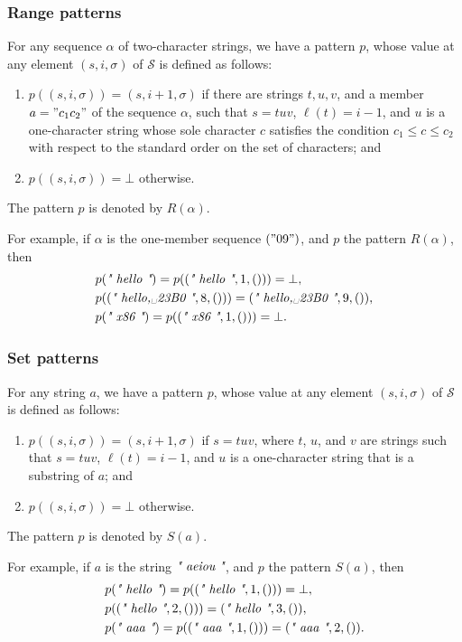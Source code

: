 \documentclass{article}
\begin{document}
\subsubsection{Range patterns}
\label{sec:9vfw1yf3}

For any sequence \(\alpha\) of two-character strings, we have a
pattern \(p\), whose value at any element \((s, i, \sigma)\) of
\(\mathscr{S}\) is defined as follows:
\begin{enumerate}
\item \(p((s, i, \sigma)) = (s, i + 1, \sigma)\) if there are strings
  \(t, u, v\), and a member \(a = "c_1c_2"\) of the sequence
  \(\alpha\), such that \(s = tuv\), \(\ell(t) = i - 1\), and \(u\) is
  a one-character string whose sole character \(c\) satisfies the
  condition \(c_1 \leq c \leq c_2\) with respect to the standard order
  on the set of characters; and
\item \(p((s, i, \sigma)) = \bot\) otherwise.
\end{enumerate}
The pattern \(p\) is denoted by \(R(\alpha)\).

For example, if \(\alpha\) is the one-member sequence \(("09")\), and
\(p\) the pattern \(R(\alpha)\), then
\begin{align*}
  &p(\text{\itshape" hello "}) = p((\text{\itshape" hello "}, 1, ())) = \bot, \\
  &p((\text{\itshape" hello,␣23B0 "}, 8, ())) = (\text{\itshape" hello,␣23B0 "}, 9, ()), \\
  &p(\text{\itshape" x86 "}) = p((\text{\itshape" x86 "}, 1, ())) = \bot.
\end{align*}

\subsubsection{Set patterns}
\label{sec:zxaanwjq}

For any string \(a\), we have a pattern \(p\), whose value at any
element \((s, i, \sigma)\) of \(\mathscr{S}\) is defined as follows:
\begin{enumerate}
\item \(p((s, i, \sigma)) = (s, i + 1, \sigma)\) if \(s = tuv\), where
  \(t\), \(u\), and \(v\) are strings such that \(s = tuv\),
  \(\ell(t) = i - 1\), and \(u\) is a one-character string that is a
  substring of \(a\); and
\item \(p((s, i, \sigma)) = \bot\) otherwise.
\end{enumerate}
The pattern \(p\) is denoted by \(S(a)\).

For example, if \(a\) is the string \(\text{\itshape" aeiou "}\), and \(p\) the
pattern \(S(a)\), then
\begin{align*}
  &p(\text{\itshape" hello "}) = p((\text{\itshape" hello "}, 1, ())) = \bot, \\
  &p((\text{\itshape" hello "}, 2, ())) = (\text{\itshape" hello "}, 3, ()), \\
  &p(\text{\itshape" aaa "}) = p((\text{\itshape" aaa "}, 1, ())) = (\text{\itshape" aaa "}, 2, ()).
\end{align*}
\end{document}
